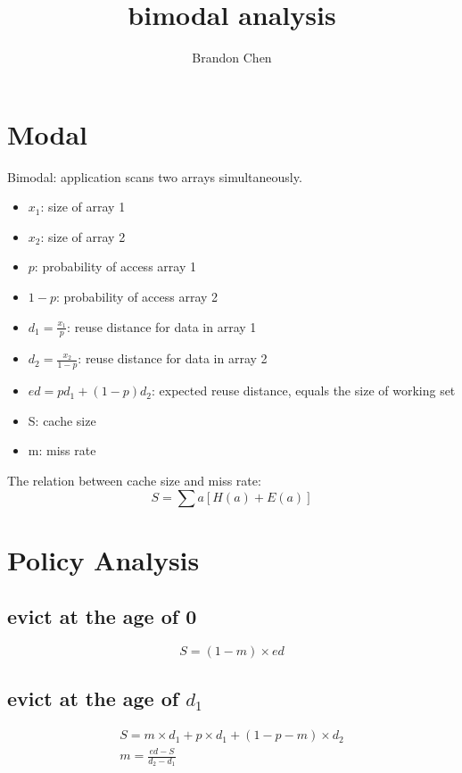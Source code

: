 \documentclass[12pt, letterpaper]{article}
\title{bimodal analysis}
\author{Brandon Chen}
\begin{document}
\maketitle

\section{Modal}

Bimodal: application scans two arrays simultaneously.

\begin{itemize}
\item $x_1$: size of array 1
\item $x_2$: size of array 2
\item $p$: probability of access array 1
\item $1-p$: probability of access array 2
\item $d_1 = \frac{x_1}{p}$: reuse distance for data in array 1
\item $d_2 = \frac{x_2}{1-p}$: reuse distance for data in array 2
\item $ed = p d_1 + (1-p) d_2$: expected reuse distance, equals the size of
working set 
\item S: cache size
\item m: miss rate
\end{itemize}

The relation between cache size and miss rate:
\begin{equation}
S = \sum a [H(a) + E(a)]
\end{equation}

\section{Policy Analysis}

\subsection{evict at the age of 0}
\begin{equation}
S = (1-m) \times ed
\end{equation}

\subsection{evict at the age of $d_1$}

\begin{equation}
\begin{gathered}
S = m \times d_1 + p \times d_1 + (1-p-m) \times d_2 \\
m = \frac{ed - S}{d_2-d_1}
\end{gathered}
\end{equation}
\end{document}
